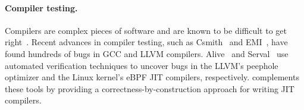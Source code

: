 \paragraph{Compiler testing.}
Compilers are complex pieces of software and are known to be difficult
to get right~\cite{marcozzi:compiler-fuzzing}.
Recent advances in compiler testing,
such as Csmith~\cite{yang:csmith} and EMI~\cite{zhang:emi},
have found hundreds of bugs in GCC and LLVM compilers.
%
Alive~\cite{lee:aliveinlean,lopes:alive} and Serval~\cite{nelson:serval}
use automated verification techniques to uncover bugs in the LLVM's peephole optimizer
and the Linux kernel's eBPF JIT compilers, respectively.
%
\jitsynth complements these tools by providing a correctness-by-construction
approach for writing JIT compilers.
